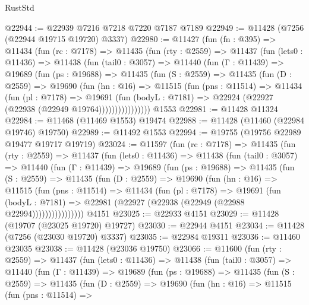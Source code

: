 \begin{lexlean}{RustStd}
\begin{coremodule}
@22944 := @22939 @7216 @7218 @7220 @7187 @7189
@22949 := @11428 (@7256 (@22944 @19715 @19720) @3337)
@22980 := @11427
    (fun (fn : @395) =>
    @11434
      (fun (rc : @7178) =>
      @11435
        (fun (rty : @2559) =>
        @11437
          (fun (lets0 : @11436) =>
          @11438
            (fun (tail0 : @3057) =>
            @11440
              (fun (Γ : @11439) =>
              @19689
                (fun (ps : @19688) =>
                @11435
                  (fun (S : @2559) =>
                  @11435
                    (fun (D : @2559) =>
                    @19690
                      (fun (hn : @16) =>
                      @11515
                        (fun (pns : @11514) =>
                        @11434
                          (fun (pl : @7178) =>
                          @19691
                            (fun (bodyL : @7181) =>
                            @22924 (@22927 (@22938 (@22949 @19764))))))))))))))))
    @1553
@22981 := @11428 @11324
@22984 := @11468 (@11469 @1553) @19474
@22988 := @11428 (@11460 (@22984 @19746) @19750)
@22989 := @11492 @1553
@22994 := @19755 (@19756 @22989 @19477 @19717 @19719)
@23024 := @11597
    (fun (rc : @7178) =>
    @11435
      (fun (rty : @2559) =>
      @11437
        (fun (lets0 : @11436) =>
        @11438
          (fun (tail0 : @3057) =>
          @11440
            (fun (Γ : @11439) =>
            @19689
              (fun (ps : @19688) =>
              @11435
                (fun (S : @2559) =>
                @11435
                  (fun (D : @2559) =>
                  @19690
                    (fun (hn : @16) =>
                    @11515
                      (fun (pns : @11514) =>
                      @11434
                        (fun (pl : @7178) =>
                        @19691
                          (fun (bodyL : @7181) =>
                          @22981 (@22927 (@22938 (@22949 (@22988 @22994))))))))))))))))
    @4151
@23025 := @22933 @4151
@23029 := @11428 (@19707 (@23025 @19720) @19727)
@23030 := @22944 @4151
@23034 := @11428 (@7256 (@23030 @19720) @3337)
@23035 := @22984 @19311
@23036 := @11460 @23035
@23038 := @11428 (@23036 @19750)
@23066 := @11600
    (fun (rty : @2559) =>
    @11437
      (fun (lets0 : @11436) =>
      @11438
        (fun (tail0 : @3057) =>
        @11440
          (fun (Γ : @11439) =>
          @19689
            (fun (ps : @19688) =>
            @11435
              (fun (S : @2559) =>
              @11435
                (fun (D : @2559) =>
                @19690
                  (fun (hn : @16) =>
                  @11515
                    (fun (pns : @11514) =>

\end{coremodule}
\end{lexlean}
